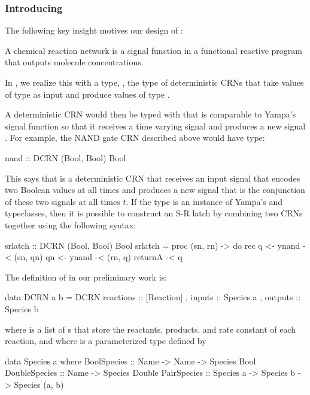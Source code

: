 \subsubsection{Introducing \reactamole{}}


The following key insight motives our design of \reactamole{}:
\begin{displayquote}
A chemical reaction network is a signal function in a functional reactive program that outputs molecule concentrations.
\end{displayquote}
In \reactamole, we realize this with a type, , the type of deterministic CRNs that take values of type  as input and produce values of type .

A deterministic CRN would then be typed with  that is comparable to Yampa's signal function  so that it receives a time varying signal  and produces a new signal .
For example, the NAND gate CRN described above would have type:

\begin{haskellcode}
nand :: DCRN (Bool, Bool) Bool
\end{haskellcode}

This says that  is a deterministic CRN that receives an input signal that encodes two Boolean values at all times and produces a new signal that is the conjunction of these two signals at all times \( t \).
If the  type is an instance of Yampa's  and  typeclasses, then it is possible to construct an S-R latch by combining two  CRNs together using the following syntax:

\begin{haskellcode}
srlatch :: DCRN (Bool, Bool) Bool
srlatch = proc (sn, rn) -> do
    rec q  <- ynand -< (sn, qn)
        qn <- ynand -< (rn, q)
    returnA -< q
\end{haskellcode}

The definition of  in our preliminary work is:
\begin{haskellcode}
data DCRN a b = DCRN { reactions :: [Reaction]
                     , inputs    :: Species a
                     , outputs   :: Species b  }
\end{haskellcode}
where  is a list of s that store the reactants, products, and rate constant of each reaction, and where  is a parameterized type defined by
\begin{haskellcode}
data Species a where
    BoolSpecies   :: Name -> Name -> Species Bool
    DoubleSpecies :: Name -> Species Double
    PairSpecies   :: Species a -> Species b -> Species (a, b)
\end{haskellcode}

